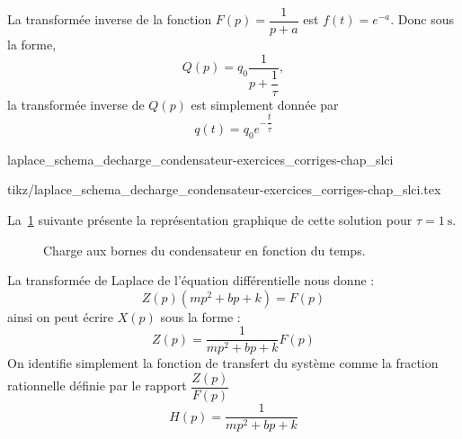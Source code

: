 La transformée inverse de la fonction $F(p)=\dfrac{1}{p+a}$ est $f(t)=e^{-a}$.
Donc sous la forme,
\[
    Q(p)=q_0\dfrac{1}{p+\dfrac{1}{\tau}},
\]
la transformée inverse de $Q(p)$ est simplement donnée par 
\[
    q(t)=q_0e^{-\dfrac{t}{\tau}}
\]
\begin{center}
    {laplace_schema_decharge_condensateur-exercices_corriges-chap_slci}
    
    {tikz/laplace_schema_decharge_condensateur-exercices_corriges-chap_slci.tex}
\end{center}
La~\cref{fig-decharge} suivante présente la représentation graphique de 
cette solution pour $\tau=\SI{1}{\second}$.
\clearpage
\begin{figure}[!h]
    \centering
    
    \caption{Charge aux bornes du condensateur en fonction du temps.
    \label{fig-decharge}}
\end{figure}
La transformée de Laplace de l'équation différentielle nous donne : 
\[
    Z(p)\left(mp^2+bp+k\right)=F(p)
\]
ainsi on peut écrire $X(p)$ sous la forme :
\[
    Z(p)=\dfrac{1}{mp^2+bp+k}F(p)
\]
On identifie simplement la fonction de transfert du système comme la fraction 
rationnelle définie par le rapport $\dfrac{Z(p)}{F(p)}$
\[
    H(p)=\dfrac{1}{mp^2+bp+k}
\]


